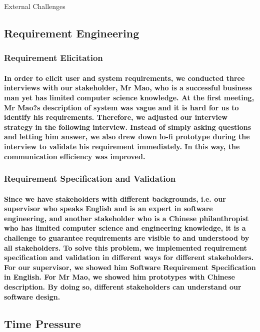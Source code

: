 \documentclass[12pt]{amsart}
\title{}
\author{}
\date{} %
\makeatletter
\renewcommand{\section}{\@startsection{section}{1}{0mm}
  {-\baselineskip}{0.5\baselineskip}{\bf\leftline}}
\makeatother
\begin{document}
\section{External Challenges}


\subsection{\textbf{Requirement Engineering}}
\subsubsection{\textbf{Requirement Elicitation}}
\paragraph{In order to elicit user and system requirements, we conducted three interviews with our stakeholder, Mr Mao, who is a successful business man yet has limited computer science knowledge. At the first meeting, Mr Mao?s description of system was vague and it is hard for us to identify his requirements. Therefore, we adjusted our interview strategy in the following interview. Instead of simply asking questions and letting him answer, we also drew down lo-fi prototype during the interview to validate his requirement immediately. In this way, the communication efficiency was improved. }
\subsubsection{\textbf{Requirement Specification and Validation}}
\paragraph{Since we have stakeholders with different backgrounds, i.e. our supervisor who speaks English and is an expert in software engineering, and another stakeholder who is a Chinese philanthropist who has limited computer science and engineering knowledge, it is a challenge to guarantee requirements are visible to and understood by all stakeholders. To solve this problem, we implemented requirement specification and validation in different ways for different stakeholders. For our supervisor, we showed him Software Requirement Specification in English. For Mr Mao, we showed him prototypes with Chinese description. By doing so, different stakeholders can understand our software design. }


\subsection{\textbf{Time Pressure}}
\end{document}
